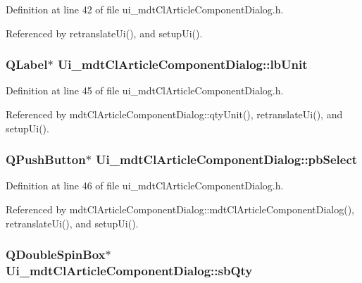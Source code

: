Definition at line 42 of file ui\-\_\-mdt\-Cl\-Article\-Component\-Dialog.\-h.



Referenced by retranslate\-Ui(), and setup\-Ui().

\hypertarget{class_ui__mdt_cl_article_component_dialog_ad2128847a4dc9f61b0bacfdb63ab5e25}{
\subsubsection[{lb\-Unit}]{\setlength{\rightskip}{0pt plus 5cm}Q\-Label$\ast$ Ui\-\_\-mdt\-Cl\-Article\-Component\-Dialog\-::lb\-Unit}}\label{class_ui__mdt_cl_article_component_dialog_ad2128847a4dc9f61b0bacfdb63ab5e25}


Definition at line 45 of file ui\-\_\-mdt\-Cl\-Article\-Component\-Dialog.\-h.



Referenced by mdt\-Cl\-Article\-Component\-Dialog\-::qty\-Unit(), retranslate\-Ui(), and setup\-Ui().

\hypertarget{class_ui__mdt_cl_article_component_dialog_a6f056c17aa9c33369e6a14677e2805a2}{
\subsubsection[{pb\-Select}]{\setlength{\rightskip}{0pt plus 5cm}Q\-Push\-Button$\ast$ Ui\-\_\-mdt\-Cl\-Article\-Component\-Dialog\-::pb\-Select}}\label{class_ui__mdt_cl_article_component_dialog_a6f056c17aa9c33369e6a14677e2805a2}


Definition at line 46 of file ui\-\_\-mdt\-Cl\-Article\-Component\-Dialog.\-h.



Referenced by mdt\-Cl\-Article\-Component\-Dialog\-::mdt\-Cl\-Article\-Component\-Dialog(), retranslate\-Ui(), and setup\-Ui().

\hypertarget{class_ui__mdt_cl_article_component_dialog_a94d59140974b961351cb510dcef99581}{
\subsubsection[{sb\-Qty}]{\setlength{\rightskip}{0pt plus 5cm}Q\-Double\-Spin\-Box$\ast$ Ui\-\_\-mdt\-Cl\-Article\-Component\-Dialog\-::sb\-Qty}}\label{class_ui__mdt_cl_article_component_dialog_a94d59140974b961351cb510dcef99581}



